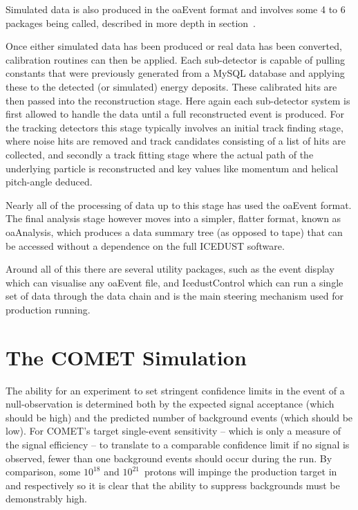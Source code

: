 Simulated data is also produced in the oaEvent format and involves some 4 to 6 packages being called, described in more depth in section~.

Once either simulated data has been produced or real data has been converted, calibration routines can then be applied.
Each sub-detector is capable of pulling constants that were previously generated from a MySQL database and applying these to the detected (or simulated) energy deposits.
These calibrated hits are then passed into the reconstruction stage.  
Here again each sub-detector system is first allowed to handle the data until a full reconstructed event is produced.
For the tracking detectors this stage typically involves an initial track finding stage, where noise hits are removed and track candidates consisting of a list of hits are collected, and secondly a track fitting stage where the actual path of the underlying particle is reconstructed and key values like momentum and helical pitch-angle deduced.

Nearly all of the processing of data up to this stage has used the oaEvent format.
The final analysis stage however moves into a simpler, flatter format, known as oaAnalysis, which produces a data summary tree (as opposed to tape) that can be accessed without a dependence on the full ICEDUST software.

Around all of this there are several utility packages, such as the event display which can visualise any oaEvent file, and IcedustControl which can run a single set of data through the data chain and is the main steering mechanism used for production running.

\section{The COMET Simulation}
The ability for an experiment to set stringent confidence limits in the event of a null-observation is determined both by the expected signal acceptance (which should be high) and the predicted number of background events (which should be low).
For COMET's target single-event sensitivity -- which is only a measure of the signal efficiency -- to translate to a comparable confidence limit if no signal is observed, fewer than one background events should occur during the run.
By comparison, some $10^{18}$ and $10^{21}$~protons  will impinge the production target in \phaseI and \phaseII respectively so it is clear that the ability to suppress backgrounds must be demonstrably high.

